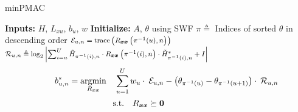 \begin{algorithm}[t]
	\caption{minPMAC} 
    \State \textbf{Inputs:} $H$, $L_{xu}$, $b_u$, $w$ 
    \vspace{0.1cm}
    \State \textbf{Initialize:} $A$, $\theta$ using SWF
    \vspace{0.1cm}
    \State $\pi \triangleq$ Indices of sorted $\theta$ in descending order
    \vspace{0.1cm}
        \vspace{0.1cm}
                \vspace{0.1cm}
                \State \hspace{-0.3cm} $\footnotesize \mathcal{E}_{u,n} = \operatorname{trace}\left(R_{\boldsymbol{x} \boldsymbol{x}}\left(\pi^{-1}(u), n\right)\right)$
                \vspace{0.1cm}
                \State \hspace{-0.3cm} $\footnotesize \mathcal{R}_{u,n} \triangleq  \log _2\left|\sum_{i=u}^U \tilde{H}_{\pi^{-1}(i), n} \cdot R_{\boldsymbol{x} \boldsymbol{x}}\left(\pi^{-1}(i), n\right) \cdot \tilde{H}_{\pi^{-1}(i), n}^*+I\right|$
            \EndFor 
            \vspace{-0.7cm}
            \State \begin{equation*}
            \hspace{0.7cm} b_{u,n}^*=\underset{{R_{\boldsymbol{xx}}}}{\operatorname{argmin}} \quad \sum_{u=1}^U w_{u} \cdot \: \mathcal{E}_{u,n}- \left(\theta_{\pi^{-1}(u)}-\theta_{\pi^{-1}(u+1)}\right) \cdot \: \mathcal{R}_{u,n} \end{equation*}
            \vspace{-0.6cm}
            \State \begin{equation*}
                \hspace{-1.6cm} \textrm{s.t.} \quad R_{\boldsymbol{xx}}  \succeq \mathbf{0}
            \end{equation*}

\end{algorithm}

